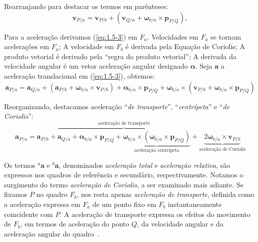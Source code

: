 Rearranjando para destacar os termos em parênteses\footnotemark{}:
\begin{equation*}
    \mathbf{v}_{P/a} = \mathbf{v}_{P/b} + \left( \mathbf{v}_{Q/a} + \mathbf{\omega}_{b/a}\!\times\!\mathbf{p}_{P/Q} \right),
\end{equation*}

Para a aceleração derivamos (\ref{eq:1.5-3}) em \(F_{a}\). Velocidades em \(F_{a}\) se tornam acelerações em \(F_{a}\); A velocidade em \(F_{b}\) é derivada pela Equação de Coriolis; A produto vetorial é derivado pela ``regra do produto vetorial''; A derivada da velocidade angular é um vetor aceleração angular designado \(\mathbf{\alpha}\). Seja \(\mathbf{a}\) a aceleração translacional em (\ref{eq:1.5-3}), obtemos:
\begin{equation*}
    \mathbf{a}_{P/a} = \mathbf{a}_{Q/a} + \left(\mathbf{a}_{P/b} + \mathbf{\omega}_{b/a}\!\times\!\mathbf{v}_{P/b}\right) + {{\mathbf{\alpha}_{b/a}}\!\times\!{\mathbf{p}_{P/Q}}} + {\mathbf{\omega}_{b/a}}\!\times\!{\left({\mathbf{v}_{P/b}} + {{\mathbf{\omega}_{b/a}}\!\times\!{\mathbf{p}_{P/Q}}}\right)}
\end{equation*}

Reorganizando, destacamos aceleração ``\emph{de transporte}'', ``\emph{centrípeta}'' e ``\emph{de Coriolis}'':
\begin{equation}
    \mathbf{a}_{P/a} = \mathbf{a}_{P/b} + \overbrace{\mathbf{a}_{Q/a} + {{\mathbf{\alpha}_{b/a}}\!\times\!{\mathbf{p}_{P/Q}}} + \underbrace{{{\mathbf{\omega}_{b/a}}\!\times\!{\left({\mathbf{\omega}_{b/a}}\!\times\!{\mathbf{p}_{P/Q}}\right)}}}_{\text{aceleração centrípeta}}}^{\text{aceleração de transporte}} + \underbrace{{2\mathbf{\omega}_{b/a}\!\times\!\mathbf{v}_{P/b}}}_{\text{aceleração de Coriolis}} \label{eq:1.5-4}
\end{equation}


Os termos \({^{a}\mathbf{a}}\) e \({^{b}\mathbf{a}}\), denominados \emph{aceleração total} e \emph{aceleração relativa}, são expressos nos quadros de referência e secundário, respectivamente. Notamos o surgimento do termo \textit{aceleração de Coriolis}, a ser examinado mais adiante. Se fixamos \(P\) no quadro \(F_{b}\), nos resta apenas \textit{aceleração de  transporte}, definida como a aceleração expressa em \(F_{a}\) de um ponto fixo em \(F_{b}\) instantaneamente coincidente com \(P\). A aceleração de transporte expressa os efeitos do movimento de \(F_{b}\), em termos de aceleração do ponto \(Q\), da velocidade angular e da aceleração angular do quadro~\cite{Stevens2016}.


